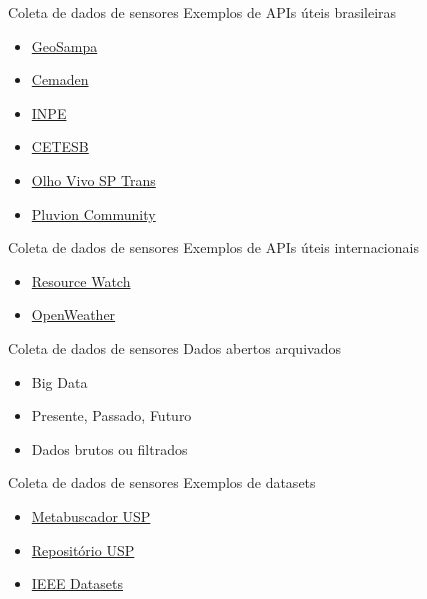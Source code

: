 \documentclass[t]{beamer}
\begin{document}
\begin{frame}{Coleta de dados de sensores}
	Exemplos de APIs úteis brasileiras
	\begin{itemize}
		\item \href{http://geosampa.prefeitura.sp.gov.br/}{GeoSampa}
		\item \href{http://www.cemaden.gov.br/mapainterativo/}{Cemaden}
		\item \href{http://www.dgi.inpe.br/CDSR/}{INPE}
		\item \href{https://cetesb.sp.gov.br/ar/dados-horarios/}{CETESB}
		\item \href{http://www.sptrans.com.br/desenvolvedores/APIOlhoVivo.aspx}{Olho Vivo SP Trans}
		\item \href{https://community.pluvion.com.br/}{Pluvion Community}
	\end{itemize}
\end{frame}

\begin{frame}{Coleta de dados de sensores}
	Exemplos de APIs úteis internacionais
	\begin{itemize}
		\item \href{https://resourcewatch.org/}{Resource Watch}
		\item \href{https://openweathermap.org/}{OpenWeather}
	\end{itemize}
\end{frame}


\begin{frame}{Coleta de dados de sensores}
	Dados abertos arquivados
	\begin{itemize}
		\item Big Data
		\item Presente, Passado, Futuro
		\item Dados brutos ou filtrados
	\end{itemize}
\end{frame}

\begin{frame}{Coleta de dados de sensores}
	Exemplos de datasets
	\begin{itemize}
		\item \href{https://metabuscador.uspdigital.usp.br/}{Metabuscador USP}
		\item \href{https://repositorio.uspdigital.usp.br/}{Repositório USP}
		\item \href{https://ieee-dataport.org/datasets}{IEEE Datasets}
	\end{itemize}
\end{frame}

\frame{\titlepage}
\end{document}
